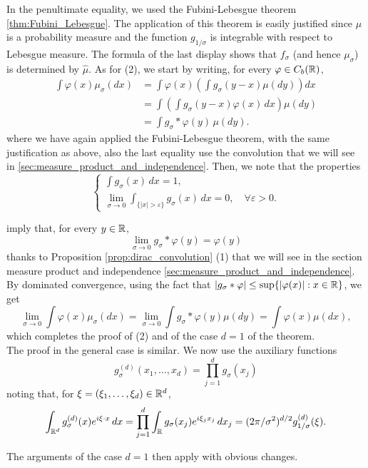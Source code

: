 \documentclass[../Main.tex]{subfiles}
\begin{document}
{In the penultimate equality, we used the Fubini-Lebesgue theorem \ref{thm:Fubini_Lebesgue}. The application of this theorem is easily justified since $\mu$ is a probability measure and the function $g_{1/\sigma}$ is integrable with respect to Lebesgue measure. The formula of the last display shows that $f_\sigma$ (and hence $\mu_\sigma$) is determined by $\widehat{\mu}$.
As for (2), we start by writing, for every $\varphi \in C_b(\mathbb{R})$,
\begin{align*}
\int \varphi(x)\mu_\sigma(dx)
    &= \int \varphi(x)\left(\int g_\sigma(y - x)\mu(dy)\right)dx \\
    &= \int \left( \int g_\sigma(y - x)\varphi(x)\,dx \right)\mu(dy) \\
    &= \int g_\sigma * \varphi(y)\,\mu(dy).
\end{align*}
where we have again applied the Fubini-Lebesgue theorem, with the same justification as above, also the last equality use the convolution that we will see in \ref{sec:measure_product_and_independence}. Then, we note that the properties
\[\begin{cases}
\int g_\sigma(x)\,dx = 1, \\
\lim_{\sigma \to 0} \int_{\{|x| > \varepsilon\}} g_\sigma(x)\,dx = 0, \quad \forall \varepsilon > 0.
\end{cases}\]

imply that, for every $y \in \mathbb{R}$,
\[ \lim_{\sigma \to 0} g_\sigma * \varphi(y) = \varphi(y) \]
thanks to Proposition \ref{prop:dirac_convolution} (1) that we will see in the section measure product and independence \ref{sec:measure_product_and_independence}. By dominated convergence, using the fact that $|g_\sigma * \varphi| \leq \sup\{|\varphi(x)| : x \in \mathbb{R}\}$, we get 
\[ \lim_{\sigma \to 0} \int \varphi(x)\mu_\sigma(dx) = \lim_{\sigma \to 0} \int g_\sigma * \varphi(y)\mu(dy) = \int \varphi(x)\mu(dx), \]
which completes the proof of (2) and of the case $d = 1$ of the theorem. \\ 
The proof in the general case is similar. We now use the auxiliary functions
\[
g_\sigma^{(d)}(x_1,\ldots,x_d) = \prod_{j=1}^d g_\sigma(x_j)
\]
noting that, for $\xi = (\xi_1,\ldots,\xi_d) \in \mathbb{R}^d$,
\[
\int_{\mathbb{R}^d} g_\sigma^{(d)}(x) e^{i\xi \cdot x}\, dx
= \prod_{j=1}^d \int_{\mathbb{R}} g_\sigma(x_j)e^{i\xi_j x_j}\, dx_j
= (2\pi/\sigma^2)^{d/2} g_{1/\sigma}^{(d)}(\xi).
\]

The arguments of the case $d = 1$ then apply with obvious changes.
}
\end{document}

